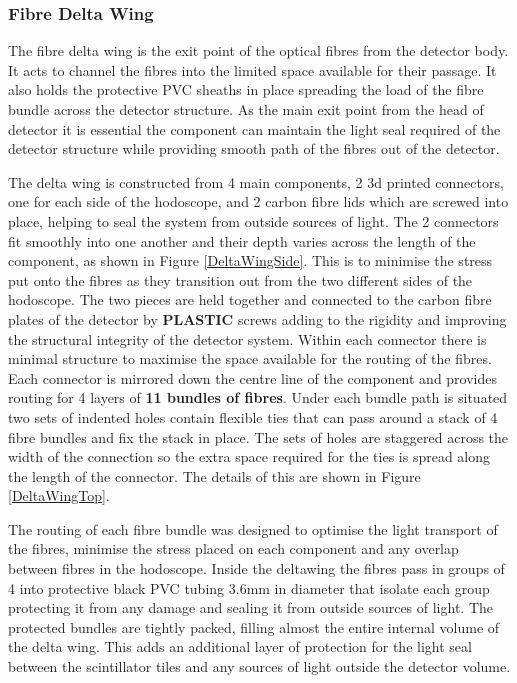 \subsubsection*{Fibre Delta Wing}

The fibre delta wing is the exit point of the optical fibres from the detector body. It acts to channel the fibres into the limited space available for their passage. It also holds the protective PVC sheaths in place spreading the load of the fibre bundle across the detector structure. As the main exit point from the head of detector it is essential the component can maintain the light seal required of the detector structure while providing smooth path of the fibres out of the detector.

The delta wing is constructed from 4 main components, 2 3d printed connectors, one for each side of the hodoscope, and 2 carbon fibre lids which are screwed into place, helping to seal the system from outside sources of light. The 2 connectors fit smoothly into one another and their depth varies across the length of the component, as shown in Figure \ref{DeltaWingSide}. This is to minimise the stress put onto the fibres as they transition out from the two different sides of the hodoscope. The two pieces are held together and connected to the carbon fibre plates of the detector by \textbf{PLASTIC} screws adding to the rigidity and improving the structural integrity of the detector system. Within each connector there is minimal structure to maximise the space available for the routing of the fibres. Each connector is mirrored down the centre line of the component and provides routing for 4 layers of \textbf{11 bundles of fibres}. Under each bundle path is situated two sets of indented holes contain flexible ties that can pass around a stack of 4 fibre bundles and fix the stack in place. The sets of holes are staggered across the width of the connection so the extra space required for the ties is spread along the length of the connector. The details of this are shown in Figure \ref{DeltaWingTop}.

The routing of each fibre bundle was designed to optimise the light transport of the fibres, minimise the stress placed on each component and any overlap between fibres in the hodoscope. Inside the deltawing the fibres pass in groups of 4 into protective black PVC tubing 3.6mm in diameter that isolate each group protecting it from any damage and sealing it from outside sources of light. The protected bundles are tightly packed, filling almost the entire internal volume of the delta wing. This adds an additional layer of protection for the light seal between the scintillator tiles and any sources of light outside the detector volume.

